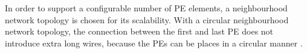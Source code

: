 In order to support a configurable number of PE elements, a neighbourhood network topology is chosen for its scalability. With a circular neighbourhood network topology, the connection between the first and last PE does not introduce extra long wires, because the PEs can be places in a circular manner \cite{dongrio2}.



 


